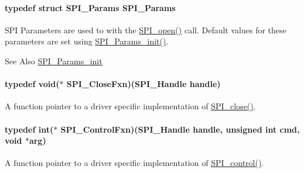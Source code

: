 \paragraph[{S\-P\-I\-\_\-\-Params}]{\setlength{\rightskip}{0pt plus 5cm}typedef struct {\bf S\-P\-I\-\_\-\-Params}  {\bf S\-P\-I\-\_\-\-Params}}\label{_s_p_i_8h_ae69b175346a856bdbb4ee6ed46b59a2f}


S\-P\-I Parameters are used to with the \hyperlink{_s_p_i_8h_a62cfe494cb1df47cd602e8747e894fd1}{S\-P\-I\-\_\-open()} call. Default values for these parameters are set using \hyperlink{_s_p_i_8h_a9c3dd1748332fd6e31c79a6538a71642}{S\-P\-I\-\_\-\-Params\-\_\-init()}. 

\begin{DoxySeeAlso}{See Also}
\hyperlink{_s_p_i_8h_a9c3dd1748332fd6e31c79a6538a71642}{S\-P\-I\-\_\-\-Params\-\_\-init} 
\end{DoxySeeAlso}
\paragraph[{S\-P\-I\-\_\-\-Close\-Fxn}]{\setlength{\rightskip}{0pt plus 5cm}typedef void($\ast$ S\-P\-I\-\_\-\-Close\-Fxn)({\bf S\-P\-I\-\_\-\-Handle} handle)}\label{_s_p_i_8h_a00416f189f122a27ca351da651dbfbd5}


A function pointer to a driver specific implementation of \hyperlink{_s_p_i_8h_a0e3448b30b88609fa120915e49560601}{S\-P\-I\-\_\-close()}. 

\paragraph[{S\-P\-I\-\_\-\-Control\-Fxn}]{\setlength{\rightskip}{0pt plus 5cm}typedef int($\ast$ S\-P\-I\-\_\-\-Control\-Fxn)({\bf S\-P\-I\-\_\-\-Handle} handle, unsigned int cmd, void $\ast$arg)}\label{_s_p_i_8h_a0796d80d841b833b08743785646288af}


A function pointer to a driver specific implementation of \hyperlink{_s_p_i_8h_ab9d3a23991be2741f382749d3844cc2f}{S\-P\-I\-\_\-control()}. 

